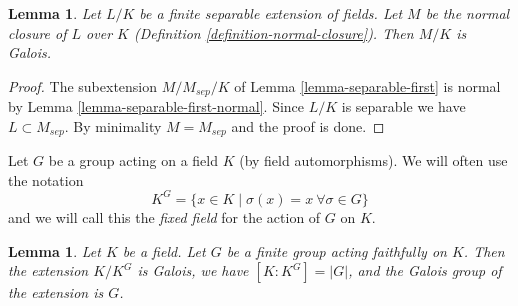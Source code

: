 \documentclass{stacks-project}
\theoremstyle{plain}
\newtheorem{lemma}[subsection]{Lemma}
\theoremstyle{definition}
\theoremstyle{remark}
\numberwithin{equation}{subsection}
\begin{document}
\begin{lemma}
\label{lemma-normal-closure-galois}
Let $L/K$ be a finite separable extension of fields.
Let $M$ be the normal closure of $L$ over $K$
(Definition \ref{definition-normal-closure}).
Then $M/K$ is Galois.
\end{lemma}

\begin{proof}
The subextension $M/M_{sep}/K$ of Lemma \ref{lemma-separable-first}
is normal by Lemma \ref{lemma-separable-first-normal}.
Since $L/K$ is separable we have $L \subset M_{sep}$.
By minimality $M = M_{sep}$ and the proof is done.
\end{proof}

\noindent
Let $G$ be a group acting on a field $K$ (by field automorphisms).
We will often use the notation
$$
K^G = \{x \in K \mid \sigma(x) = x \ \forall \sigma \in G\}
$$
and we will call this the {\it fixed field} for the action of $G$ on $K$.

\begin{lemma}
\label{lemma-galois-over-fixed-field}
Let $K$ be a field. Let $G$ be a finite group acting faithfully on $K$.
Then the extension $K/K^G$ is Galois, we have $[K : K^G] = |G|$,
and the Galois group of the extension is $G$.
\end{lemma}
\end{document}
